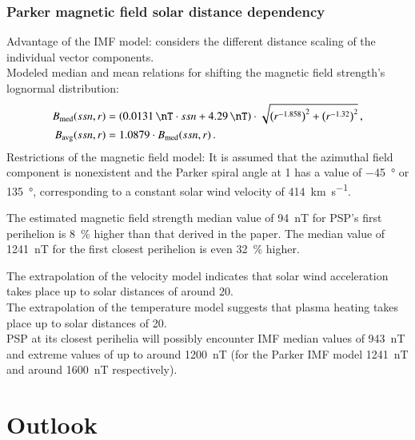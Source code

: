\subsubsection*{Parker magnetic field solar distance dependency}
Advantage of the IMF model: considers the different distance scaling of the individual vector components.\\

Modeled median and mean relations for shifting the magnetic field strength's lognormal distribution:
\begin{align*}
	B_\text{med}(ssn,r) &= \left(\SI{0.0131}{\nT} \cdot ssn + \SI{4.29}{\nT}\right) \cdot \sqrt{\left(r^{-1.858}\right)^2 + \left(r^{-1.32}\right)^2}	\,,\\
	B_\text{avg}(ssn,r) &= 1.0879 \cdot B_\text{med}(ssn,r)	\,.
\end{align*}
Restrictions of the magnetic field model: It is assumed that the azimuthal field component is nonexistent and the Parker spiral angle at \SI{1}{\au} has a value of \SI{-45}{\degree} or \SI{135}{\degree}, corresponding to a constant solar wind velocity of \SI{414}{\km\per\s}.

The estimated magnetic field strength median value of \SI{94}{\nano\tesla} for PSP's first perihelion is \SI{8}{\%} higher than that derived in the paper. The median value of \SI{1241}{\nano\tesla} for the first closest perihelion is even \SI{32}{\%} higher.



The extrapolation of the velocity model indicates that solar wind acceleration takes place up to solar distances of around \SI{20}{\Rs}.\\
The extrapolation of the temperature model suggests that plasma heating takes place up to solar distances of \SI{20}{\Rs}.\\
PSP at its closest perihelia will possibly encounter IMF median values of \SI{943}{\nano\tesla} and extreme values of up to around \SI{1200}{\nano\tesla} (for the Parker IMF model \SI{1241}{\nano\tesla} and around \SI{1600}{\nano\tesla} respectively).\\




\section{Outlook}



